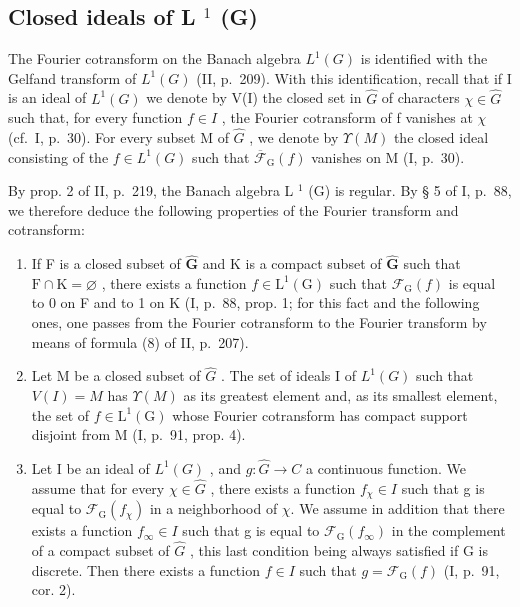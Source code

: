 \subsection{\texorpdfstring{Closed ideals of L \(^{1}\) (G)}{Closed ideals of L \^{}\{1\} (G)}}

The Fourier cotransform on the Banach algebra \(L^{1}(G)\) is identified with the Gelfand transform of \(L^{1}(G)\) (II, p.~209). With this identification, recall that if I is an ideal of \(L^{1}(G)\) we denote by V(I) the closed set in \(\widehat{G}\) of characters \(\chi \in \widehat{G}\) such that, for every function \(f \in I\) , the Fourier cotransform of f vanishes at \(\chi\) (cf.~I, p.~30). For every subset M of \(\widehat{G}\) , we denote by \(\Upsilon(M)\) the closed ideal consisting of the \(f \in L^{1}(G)\) such that \(\overline{\mathcal{F}}_{\mathrm{G}}(f)\) vanishes on M (I, p.~30).

By prop. 2 of II, p.~219, the Banach algebra L \(^{1}\) (G) is regular. By § 5 of I, p.~88, we therefore deduce the following properties of the Fourier transform and cotransform:

\begin{enumerate}
\def\labelenumi{\arabic{enumi})}
\item
  If F is a closed subset of \(\widehat{\mathbf{G}}\) and K is a compact subset of \(\widehat{\mathbf{G}}\) such that \(\mathrm{F} \cap \mathrm{K} = \varnothing\) , there exists a function \(f \in \mathrm{L}^{1}(\mathrm{G})\) such that \(\mathcal{F}_{\mathrm{G}}(f)\) is equal to 0 on F and to 1 on K (I, p.~88, prop. 1; for this fact and the following ones, one passes from the Fourier cotransform to the Fourier transform by means of formula (8) of II, p.~207).
\item
  Let M be a closed subset of \(\widehat{G}\) . The set of ideals I of \(L^{1}(G)\) such that \(V(I) = M\) has \(\Upsilon(M)\) as its greatest element and, as its smallest element, the set of \(f \in \mathrm{L}^{1}(\mathrm{G})\) whose Fourier cotransform has compact support disjoint from M (I, p.~91, prop. 4).
\item
  Let I be an ideal of \(L^{1}(G)\) , and \(g\colon\widehat{G}\to C\) a continuous function. We assume that for every \(\chi\in\widehat{G}\) , there exists a function \(f_{\chi}\in I\) such that g is equal to \(\mathcal{F}_{\mathrm{G}}(f_{\chi})\) in a neighborhood of \(\chi\). We assume in addition that there exists a function \(f_{\infty}\in I\) such that g is equal to \(\mathcal{F}_{\mathrm{G}}(f_{\infty})\) in the complement of a compact subset of \(\widehat{G}\) , this last condition being always satisfied if G is discrete. Then there exists a function \(f\in I\) such that \(g=\mathcal{F}_{\mathrm{G}}(f)\) (I, p.~91, cor. 2).
\end{enumerate}

